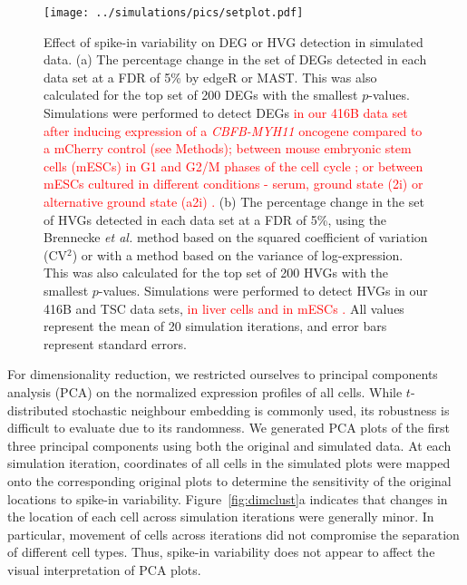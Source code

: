 \documentclass{article}
\newcommand{\revised}[1]{\textcolor{red}{#1}}
\begin{document}
\begin{figure}[btp]
    \begin{center}
        \texttt{[image: ../simulations/pics/setplot.pdf]}
    \end{center}
    \caption{Effect of spike-in variability on DEG or HVG detection in simulated data.
        (a) The percentage change in the set of DEGs detected in each data set at a FDR of 5\% by edgeR or MAST.
        This was also calculated for the top set of 200 DEGs with the smallest $p$-values.
        Simulations were performed to detect DEGs \revised{in our 416B data set after inducing expression of a \textit{CBFB-MYH11} oncogene compared to a mCherry control (see Methods);
        between mouse embryonic stem cells (mESCs) in G1 and G2/M phases of the cell cycle \autocite{buettner2015computational};
        or between mESCs cultured in different conditions - serum, ground state (2i) or alternative ground state (a2i) \autocite{grun2014validation,kolod2015single}.}
        (b) The percentage change in the set of HVGs detected in each data set at a FDR of 5\%,
        using the Brennecke \textit{et al.} method based on the squared coefficient of variation (CV$^2$) or with a method based on the variance of log-expression.
        This was also calculated for the top set of 200 HVGs with the smallest $p$-values.
        Simulations were performed to detect HVGs in our 416B and TSC data sets, \revised{in liver cells \autocite{scialdone2015computational} and in mESCs \autocite{kolod2015single}.}
        All values represent the mean of 20 simulation iterations, and error bars represent standard errors.
    }
    \label{fig:setchange}
\end{figure}

For dimensionality reduction, we restricted ourselves to principal components analysis (PCA) on the normalized expression profiles of all cells. 
While $t$-distributed stochastic neighbour embedding \autocite{van2008visualizing} is commonly used, its robustness is difficult to evaluate due to its randomness.
We generated PCA plots of the first three principal components using both the original and simulated data.
At each simulation iteration, coordinates of all cells in the simulated plots were mapped onto the corresponding original plots to determine the sensitivity of the original locations to spike-in variability.
Figure~\ref{fig:dimclust}a indicates that changes in the location of each cell across simulation iterations were generally minor.
In particular, movement of cells across iterations did not compromise the separation of different cell types. 
Thus, spike-in variability does not appear to affect the visual interpretation of PCA plots.
\end{document}
